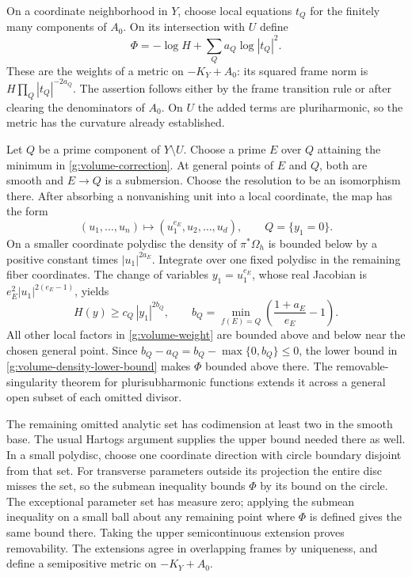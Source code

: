 On a coordinate neighborhood in $Y$, choose local equations $t_Q$ for
the finitely many components of $A_0$.  On its intersection with $U$
define
\begin{equation}\label{g:volume-weight}
 \Phi=-\log H+\sum_Q a_Q\log|t_Q|^2.
\end{equation}
These are the weights of a metric on $-K_Y+A_0$: its squared frame
norm is $H\prod_Q|t_Q|^{-2a_Q}$.  The assertion follows either by
the frame transition rule or after clearing the denominators of
$A_0$.  On $U$ the added terms are pluriharmonic, so the metric has
the curvature already established.

Let $Q$ be a prime component of $Y\setminus U$.  Choose a prime $E$
over $Q$ attaining the minimum in
\eqref{g:volume-correction}.  At general points of $E$ and $Q$, both
are smooth and $E\to Q$ is a submersion.  Choose the resolution to be
an isomorphism there.  After absorbing a nonvanishing unit into a
local coordinate, the map has the form
\[
 (u_1,\ldots,u_n)\longmapsto
 (u_1^{e_E},u_2,\ldots,u_d),
 \qquad Q=\{y_1=0\}.
\]
On a smaller coordinate polydisc the density of $\pi^*\Omega_h$ is
bounded below by a positive constant times $|u_1|^{2a_E}$.
Integrate over one fixed polydisc in the remaining fiber coordinates.
The change of variables $y_1=u_1^{e_E}$, whose real Jacobian is
$e_E^2|u_1|^{2(e_E-1)}$, yields
\begin{equation}\label{g:volume-density-lower-bound}
 H(y)\geq c_Q\,|y_1|^{2b_Q},
 \qquad b_Q=\min_{f(E)=Q}
                  \left(\frac{1+a_E}{e_E}-1\right).
\end{equation}
All other local factors in \eqref{g:volume-weight} are bounded above
and below near the chosen general point.  Since
$b_Q-a_Q=b_Q-\max\{0,b_Q\}\leq0$, the lower bound in
\eqref{g:volume-density-lower-bound} makes $\Phi$ bounded above
there.  The removable-singularity theorem for plurisubharmonic
functions extends it across a general open subset of each omitted
divisor.

The remaining omitted analytic set has codimension at least two in
the smooth base.  The usual Hartogs argument supplies the upper
bound needed there as well.  In a small polydisc, choose one
coordinate direction with circle boundary disjoint from that set.
For transverse parameters outside its projection the entire disc
misses the set, so the submean inequality bounds $\Phi$ by its bound
on the circle.  The exceptional parameter set has measure zero;
applying the submean inequality on a small ball about any remaining
point where $\Phi$ is defined gives the same bound there.  Taking the upper
semicontinuous extension proves removability.  The extensions agree
in overlapping frames by uniqueness, and define a semipositive
metric on $-K_Y+A_0$.

